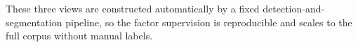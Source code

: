 \noindent These three views are constructed automatically by a fixed detection-and-segmentation pipeline, so the factor supervision is reproducible and scales to the full corpus without manual labels.



